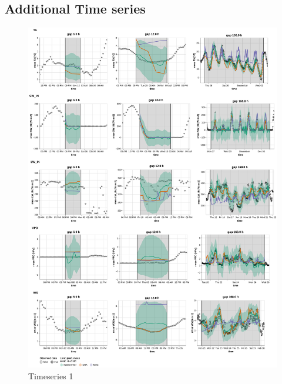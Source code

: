 \documentclass{article}
\newcommand{\imgwidth}{6in}
\let\Oldsubsection\subsection
\renewcommand{\subsection}{\FloatBarrier\Oldsubsection}
\begin{document}

\subsection{Additional Time series}

\begin{figure}
\centerline{\includegraphics[width=\imgwidth]{images2/timeseries_1_1}}
\caption{Timeseries 1}
\label{fig:ts_2-1}
\end{figure}
\end{document}
